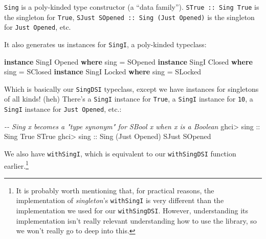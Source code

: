 \documentclass[]{article}
\newenvironment{Shaded}{}{}
\newcommand{\CommentTok}[1]{\textcolor[rgb]{0.38,0.63,0.69}{\textit{#1}}}
\newcommand{\DataTypeTok}[1]{\textcolor[rgb]{0.56,0.13,0.00}{#1}}
\newcommand{\KeywordTok}[1]{\textcolor[rgb]{0.00,0.44,0.13}{\textbf{#1}}}
\newcommand{\NormalTok}[1]{#1}
\newcommand{\OperatorTok}[1]{\textcolor[rgb]{0.40,0.40,0.40}{#1}}
\newcommand{\OtherTok}[1]{\textcolor[rgb]{0.00,0.44,0.13}{#1}}
\begin{document}
\texttt{Sing} is a poly-kinded type constructor (a ``data family'').
\texttt{STrue\ ::\ Sing\ \textquotesingle{}True} is the singleton for
\texttt{\textquotesingle{}True},
\texttt{SJust\ SOpened\ ::\ Sing\ (\textquotesingle{}Just\ \textquotesingle{}Opened)}
is the singleton for \texttt{\textquotesingle{}Just\ \textquotesingle{}Opened},
etc.

It also generates us instances for \texttt{SingI}, a poly-kinded typeclass:

\begin{Shaded}
\begin{Highlighting}[]
\KeywordTok{instance} \DataTypeTok{SingI} \DataTypeTok{\textquotesingle{}Opened} \KeywordTok{where}
\NormalTok{    sing }\OtherTok{=} \DataTypeTok{SOpened}
\KeywordTok{instance} \DataTypeTok{SingI} \DataTypeTok{\textquotesingle{}Closed} \KeywordTok{where}
\NormalTok{    sing }\OtherTok{=} \DataTypeTok{SClosed}
\KeywordTok{instance} \DataTypeTok{SingI} \DataTypeTok{\textquotesingle{}Locked} \KeywordTok{where}
\NormalTok{    sing }\OtherTok{=} \DataTypeTok{SLocked}
\end{Highlighting}
\end{Shaded}

Which is basically our \texttt{SingDSI} typeclass, except we have instances for
singletons of all kinds! (heh) There's a \texttt{SingI} instance for
\texttt{\textquotesingle{}True}, a \texttt{SingI} instance for \texttt{10}, a
\texttt{SingI} instance for
\texttt{\textquotesingle{}Just\ \textquotesingle{}Opened}, etc.:

\begin{Shaded}
\begin{Highlighting}[]
\CommentTok{{-}{-} Sing x becomes a "type synonym" for SBool x when x is a Boolean}
\NormalTok{ghci}\OperatorTok{>}\OtherTok{ sing ::} \DataTypeTok{Sing} \DataTypeTok{\textquotesingle{}True}
\DataTypeTok{STrue}
\NormalTok{ghci}\OperatorTok{>}\OtherTok{ sing ::} \DataTypeTok{Sing}\NormalTok{ (}\DataTypeTok{\textquotesingle{}Just} \DataTypeTok{\textquotesingle{}Opened}\NormalTok{)}
\DataTypeTok{SJust} \DataTypeTok{SOpened}
\end{Highlighting}
\end{Shaded}

We also have \texttt{withSingI}, which is equivalent to our \texttt{withSingDSI}
function earlier.\footnote{It is probably worth mentioning that, for practical
  reasons, the implementation of \emph{singleton}'s \texttt{withSingI} is very
  different than the implementation we used for our \texttt{withSingDSI}.
  However, understanding its implementation isn't really relevant understanding
  how to use the library, so we won't really go to deep into this.}
\end{document}
